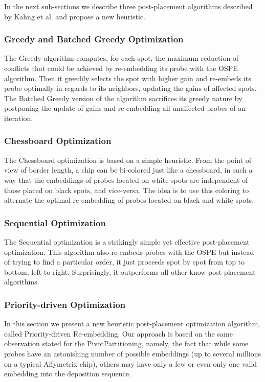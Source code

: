 \documentclass{article}
\begin{document}
In the next sub-sections we describe three post-placement algorithms described by Kahng et al. \cite{KAHNG03} \cite{KAHNG03B} and propose a new heuristic.

\subsubsection{Greedy and Batched Greedy Optimization}

The Greedy algorithm computes, for each spot, the maximum reduction of conflicts that could be achieved by re-embedding its probe with the OSPE algorithm. Then it greedily selects the spot with higher gain and re-embeds its probe optimally in regards to its neighbors, updating the gains of affected spots. The Batched Greedy version of the algorithm sacrifices its greedy nature by postponing the update of gains and re-embedding all unaffected probes of an iteration. 

\subsubsection{Chessboard Optimization}

The Chessboard optimization is based on a simple heuristic. From the point of view of border length, a chip can be bi-colored just like a chessboard, in such a way that the embeddings of probes located on white spots are independent of those placed on black spots, and vice-versa. The idea is to use this coloring to alternate the optimal re-embedding of probes located on black and white spots. 

\subsubsection{Sequential Optimization}

The Sequential optimization is a strikingly simple yet effective post-placement optimization. This algorithm also re-embeds probes with the OSPE but instead of trying to find a particular order, it just proceeds spot by spot from top to bottom, left to right. Surprisingly, it outperforms all other know post-placement algorithms. 

\subsubsection{Priority-driven Optimization}

In this section we present a new heuristic post-placement optimization algorithm, called Priority-driven Re-embedding. Our approach is based on the same observation stated for the PivotPartitioning, namely, the fact that while some probes have an astonishing number of possible embeddings (up to several millions on a typical Affymetrix chip), others may have only a few or even only one valid embedding into the deposition sequence. 
\end{document}

